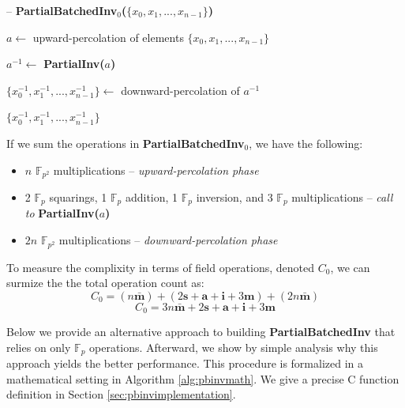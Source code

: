 \begin{algorithm}
\caption{-- \textbf{PartialBatchedInv$_0$($\{x_0, x_1, ... , x_{n-1}\}$)}}\label{alg:partialinv}
\begin{algorithmic}[1]
\State $a \gets$ upward-percolation of elements $\{x_0, x_1, ... , x_{n-1}\}$

\State $a^{-1} \gets$ \textbf{PartialInv($a$)}

\State $\{x_{0}^{-1}, x_{1}^{-1}, ... , x_{n-1}^{-1}\} \gets$ downward-percolation of $a^{-1}$

\State \Return $\{x_{0}^{-1}, x_{1}^{-1}, ... , x_{n-1}^{-1}\}$
\end{algorithmic}
\end{algorithm}
\noindent
If we sum the operations in \textbf{PartialBatchedInv}$_0$, we have the following:
\begin{itemize}
\item $n$ $\mathbb{F}_{p^2}$ multiplications -- \emph{upward-percolation phase}
\item 2 $\mathbb{F}_{p}$ squarings, 1 $\mathbb{F}_{p}$ addition, 1 $\mathbb{F}_{p}$ inversion, and 3 $\mathbb{F}_{p}$ multiplications -- \emph{call to} \textbf{PartialInv($a$)}
\item $2n$ $\mathbb{F}_{p^2}$ multiplications -- \emph{downward-percolation phase}
\end{itemize}
To measure the complixity in terms of field operations, denoted $C_0$, we can surmize the the total operation count as:
$$
C_0 = (n\bar{\textbf{m}}) + (2\textbf{s} + \textbf{a} + \textbf{i} + 3\textbf{m}) + (2n\bar{\textbf{m}})
$$
$$
C_0 = 3n\bar{\textbf{m}} + 2\textbf{s} + \textbf{a} + \textbf{i} + 3\textbf{m}
$$

Below we provide an alternative approach to building \textbf{PartialBatchedInv} that relies on only $\mathbb{F}_{p}$ operations. Afterward, we show by simple analysis why this approach yields the better performance. This procedure is formalized in a mathematical setting in Algorithm \ref{alg:pbinvmath}. We give a precise C function definition in Section \ref{sec:pbinvimplementation}.

